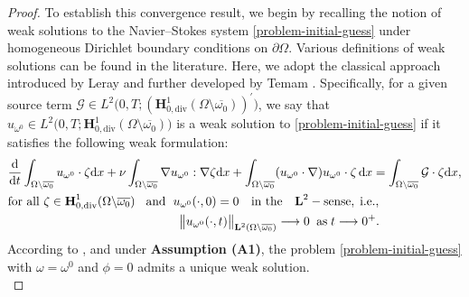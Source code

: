 \documentclass[a4paper,12pt,reqno,natbib]{amsart}
\newcommand{\dx} {\displaystyle\mathrm{d}x}
\newcommand{\dt} {\displaystyle\mathrm{d}t}
\def\H{\textbf{H}}
\def\L{\textbf{L}}
\begin{document}
\begin{proof}
To establish this convergence result, we begin by recalling the notion of weak solutions to the Navier--Stokes system \eqref{problem-initial-guess} under homogeneous Dirichlet boundary conditions on \( \partial\Omega \). Various definitions of weak solutions can be found in the literature. Here, we adopt the classical approach introduced by Leray \cite{leray1933etude} and further developed by Temam \cite[Chapter III, Section 3]{temam1973theory}. Specifically, for a given source term $\mathcal{G} \in L^2\big(0,T;(\H^1_{0,\text{div}}(\Omega \setminus \overline{\omega_0}))^\prime\big)$, we say that $u_{\omega^0} \in L^2\big(0,T;\H^1_{0,\text{div}}(\Omega \setminus \overline{\omega_0})\big)$ is a weak solution to \eqref{problem-initial-guess} if it satisfies the following weak formulation:
\begin{align*}
\begin{split}
&\displaystyle \frac{\text{d}}{\dt} \int_{\Omega\backslash\overline{\omega_0}}u_{\omega^0}\cdot \zeta \dx+\nu \int_{\Omega\backslash\overline{\omega_0}}\hspace{-0.0cm}\nabla u_{\omega^0} :\nabla \zeta \dx + \int_{\Omega\backslash\overline{\omega_0}} (u_{\omega^0}\cdot \nabla) u_{\omega^0} \cdot \zeta\, \dx=\int_{\Omega\backslash\overline{\omega_0}}\hspace{-0.0cm} \mathcal{G}\cdot \zeta \dx,\\ 
&\text{for all }  \zeta \in \H^1_{0,\text{div}}(\Omega\backslash\overline{\omega_0})\;\;\text{ and }\; u_{\omega^0}(\cdot,0)= 0 \quad \mbox{in the}\quad \L^2-\text{sense},\;\text{i.e.},\\
&\qquad\qquad\qquad\qquad\qquad\qquad\qquad\big\| u_{\omega^0}(\cdot,t)\big\|_{\L^2(\Omega\backslash\overline{\omega_0})}\longrightarrow0\;\;\text{as}\;t\longrightarrow0^+.
\end{split}
\end{align*} 
According to \cite[Theorem 3.1, p. 226]{temam1973theory}, and under \textbf{Assumption (A1)}, the problem \eqref{problem-initial-guess} with \( \omega = \omega^0 \) and \( \phi = 0 \) admits a unique weak solution.\\


\end{proof}
\end{document}
